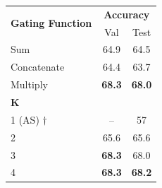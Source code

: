 \documentclass[11pt,a4paper]{article}
\begin{document}
\begin{table}[ht]
{\begin{tabular}{@{}l|c|c@{}}
\toprule
\multirow{2}{*}{\textbf{Gating Function}} & \multicolumn{2}{c}{\textbf{Accuracy}} \\ \cmidrule(l){2-3} 
                                          & Val                & Test              \\ \midrule
Sum                                       & 64.9               & 64.5             \\
Concatenate                               & 64.4               & 63.7              \\
Multiply                                  & \textbf{68.3}               & \textbf{68.0}              \\ \midrule

$\mathbf{K}$	&	&	\\ \midrule
1 (AS) $\dagger$                   & --               & 57             \\
2			                               & 65.6               & 65.6              \\
3                                & \textbf{68.3}               & 68.0              \\
4                                & \textbf{68.3}               & \textbf{68.2}              \\\bottomrule
\end{tabular}
}
\end{table}
\end{document}

